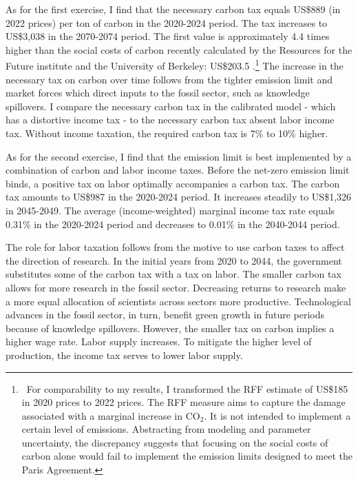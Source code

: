 As for the first exercise, I find that the necessary carbon tax equals US\$889 (in 2022 prices) per ton of carbon in the 2020-2024 period. The tax increases to US\$3,038 in the 2070-2074 period. The first value is approximately 4.4 times higher than the social costs of carbon recently calculated by the Resources for the Future institute and the University of Berkeley: US\$203.5 \citep{Rennert2022ComprehensiveCO2}.\footnote{\  For comparability to my results, I transformed the RFF estimate of US\$185 in 2020 prices to 2022 prices. The RFF measure aims to capture the damage associated with a marginal increase in CO$_2$. It is not intended to implement a certain level of emissions. Abstracting from modeling and parameter uncertainty, the discrepancy suggests that focusing on the social costs of carbon alone would fail to implement the emission limits designed to meet the Paris Agreement. } 
The  increase in the necessary tax on carbon over time follows from the tighter emission limit and market forces which direct inputs to the fossil sector, such as knowledge spillovers. I compare the necessary carbon tax in the calibrated model - which has a distortive income tax - to the necessary carbon tax absent labor income tax. Without income taxation, the required carbon tax is  7\% to 10\% higher.

As for the second exercise, I find that the emission limit is best implemented by a combination of carbon and labor income taxes. Before the net-zero emission limit binds, a positive tax on labor optimally accompanies a carbon tax. The carbon tax amounts to US\$987 in the 2020-2024 period. It increases steadily to US\$1,326 in 2045-2049. The average (income-weighted) marginal income tax rate equals 0.31\% in the 2020-2024 period and decreases to 0.01\% in the 2040-2044 period.

The role for labor taxation follows from the  motive to use carbon taxes to affect the direction of research. In the initial years from 2020 to 2044, the government substitutes some of the carbon tax with a tax on labor. The smaller carbon tax allows for more research in the fossil sector. Decreasing returns to research make a more equal allocation of scientists across sectors more productive. Technological advances in the fossil sector, in turn, benefit green growth in future periods because of knowledge spillovers. However, the smaller tax on carbon implies a higher wage rate. Labor supply increases. To mitigate the higher level of production, the income tax serves to lower labor supply.

